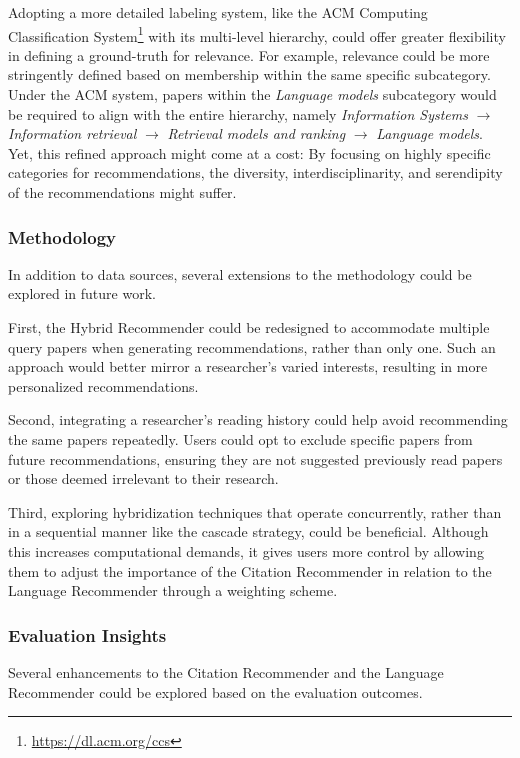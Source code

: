 Adopting a more detailed labeling system, like the ACM Computing Classification System\footnote{\url{https://dl.acm.org/ccs}} with its multi-level hierarchy, could offer greater flexibility in defining a ground-truth for relevance.
For example, relevance could be more stringently defined based on membership within the same specific subcategory. Under the ACM system, papers within the \emph{Language models} subcategory would be required to align with the entire hierarchy, namely \emph{Information Systems} $\rightarrow$ \emph{Information retrieval} $\rightarrow$ \emph{Retrieval models and ranking} $\rightarrow$ \emph{Language models}.
Yet, this refined approach might come at a cost: By focusing on highly specific categories for recommendations, the diversity, interdisciplinarity, and serendipity of the recommendations might suffer.


\subsubsection*{Methodology}

In addition to data sources, several extensions to the methodology could be explored in future work.

First, the Hybrid Recommender could be redesigned to accommodate multiple query papers when generating recommendations, rather than only one. Such an approach would better mirror a researcher's varied interests, resulting in more personalized recommendations.

Second, integrating a researcher's reading history could help avoid recommending the same papers repeatedly.
Users could opt to exclude specific papers from future recommendations, ensuring they are not suggested previously read papers or those deemed irrelevant to their research.

Third, exploring hybridization techniques that operate concurrently, rather than in a sequential manner like the cascade strategy, could be beneficial. Although this increases computational demands, it gives users more control by allowing them to adjust the importance of the Citation Recommender in relation to the Language Recommender through a weighting scheme.


\subsubsection*{Evaluation Insights}

Several enhancements to the Citation Recommender and the Language Recommender could be explored based on the evaluation outcomes.

